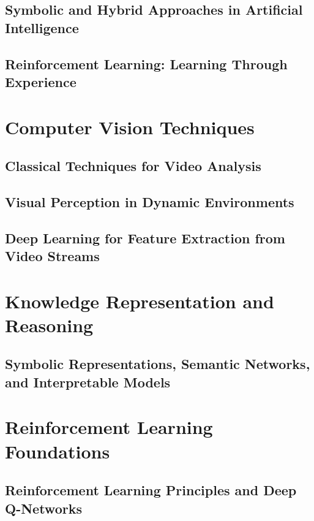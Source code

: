 \documentclass[12pt,a4paper]{report}
\begin{document}
\subsection{Symbolic and Hybrid Approaches in Artificial Intelligence}

\subsection{Reinforcement Learning: Learning Through Experience}

\section{Computer Vision Techniques}

\subsection{Classical Techniques for Video Analysis}

\subsection{Visual Perception in Dynamic Environments}

\subsection{Deep Learning for Feature Extraction from Video Streams}

\section{Knowledge Representation and Reasoning}

\subsection{Symbolic Representations, Semantic Networks, and Interpretable Models}

\section{Reinforcement Learning Foundations}

\subsection{Reinforcement Learning Principles and Deep Q-Networks}
\end{document}
